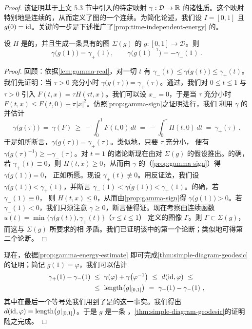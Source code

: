 \begin{proof}
该证明基于上文 5.3 节中引入的特定映射 $\gamma:\mathcal{D}\to\mathbb{R}$ 的诸性质。这个映射%
特别地是连续的，从而定义了\trBifurcation{}图的一个连续\trSection。为简化论述，我们设%
$I=[0,1]$ 且 $g(0)=\mathrm{id}$。关键的一步是下述推广了\cref{prop:time-independent-energy}%
的\trhLemma。

\begin{lemma}\label{lem:gamma-endpoints}
设 $H$ 是\trQuasiAutonomous{}的，并且生成一条具有\trSimple{}的\trBifurcation{}图 $\Sigma(g)$ 的\trPath%
$g:[0,1]\to\mathcal{D}$。则
\[
\gamma\bigl(g(1)\bigr)=\gamma_{+}(1),\qquad\gamma\bigl(g(1)^{-1}\bigr)=-\gamma_{-}(1)\ .
\]
\end{lemma}

\begin{proof}
回顾：依据\cref{lem:gamma-real}，对一切 $t$ 有 $\gamma_{-}(t)\leq\gamma\bigl(g(t)\bigr)%
\leq\gamma_{+}(t)$。我们先证明：当 $\tau>0$ 充分小时 $\gamma\bigl(g(\tau)\bigr)=%
\gamma_{+}(\tau)$。通过\trReparametrization，我们对 $0\leq t\leq1$ 与 $\tau>0$ 引入%
$F(t,x)=\tau H(\tau t,x)$。我们可以设 $x_{-}=0$，于是当 $\tau$ 充分小时%
$F(t,x)\leq F(t,0)+\pi\lvert x\rvert^{2}$。仿照\cref{prop:gamma-sign}之证明进行，我们%
利用 $\gamma$ 的\trMonotonicity{}并估计
\[
\gamma\bigl(g(\tau)\bigr)\ =\ \gamma(F)\ \geq\ -\int_{0}^{1}F(t,0)\,dt\ =\ %
-\int_{0}^{\tau}H(t,0)\,dt\ =\ \gamma_{+}(\tau)\ .
\]
于是如所断言，$\gamma\bigl(g(\tau)\bigr)=\gamma_{+}(\tau)$。类似地，只要 $\tau$ 充分小，%
便有 $\gamma\bigl(g(\tau)^{-1}\bigr)\geq-\gamma_{-}(\tau)$。对 $t=1$ 的诸论断现在由对%
$\Sigma(g)$ 的假设推出。的确，若 $\gamma_{+}(t)\equiv0$，则 $H(t,x)\geq0$，从而由%
$\gamma$ 的\trMonotonicity{}（\cref{prop:gamma-sign}）得 $\gamma\bigl(g(1)\bigr)=0$，%
正如所愿。现设 $\gamma_{+}(t)\not\equiv0$。用反证法，我们设%
$\gamma\bigl(g(1)\bigr)<\gamma_{+}(1)$，并断言%
$\gamma_{-}(1)<\gamma\bigl(g(1)\bigr)<\gamma_{+}(1)$。的确，若 $\gamma_{-}(1)\equiv0$，%
则 $H(t,x)\leq0$，从而由\cref{prop:gamma-sign}得 $\gamma\bigl(g(1)\bigr)>0$。若%
$\gamma_{-}(1)<0$，我们只须注意 $\gamma\geq0$，断言便得证。现在考察由连续函数%
$u(t)=\min\bigl\{\gamma\bigl(g(t)\bigr),\gamma_{+}(t)\bigr\}$（$\tau\leq t\leq1$）%
定义的图像 $\Gamma$。则 $\Gamma\subset\Sigma(g)$，而这与 $\Sigma(g)$ 所要求的\trSimplicity{}相%
矛盾。我们已证明该\trhLemma{}中的第一个论断；类似地可得第二个论断。
\end{proof}

现在，依据\cref{prop:gamma-energy-estimate}%
即可完成\cref{thm:simple-diagram-geodesic}的证明；简记 $g(1)=\varphi$，我们可以估计
\begin{align*}
\gamma_{+}(1)-\gamma_{-}(1)\ &\leq\ \gamma(\varphi)+\gamma\bigl(\varphi^{-1}\bigr)\ \leq\ d(\id,\varphi)\ \leq\\
&\leq\ \operatorname{length}\bigl(g|_{[0,1]}\bigr)\ =\ \gamma_{+}(1)-\gamma_{-}(1)\ ,
\end{align*}
其中在最后一个等号处我们用到了\trHamiltonianFunction{}是\trQuasiAutonomous{}的这一事实。我们得出%
$d(\mathrm{id},\varphi)=\operatorname{length}\bigl(g|_{[0,1]}\bigr)$。于是 $g$ 是一条\trMinimal%
\trGeodesic，\cref{thm:simple-diagram-geodesic}的证明随之完成。
\end{proof}

